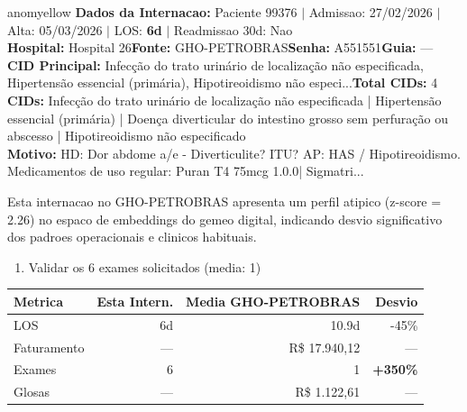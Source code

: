 \documentclass[a4paper,10pt]{article}
\begin{document}
\begin{anomalycard}[Internacao 167043 | GHO-PETROBRAS | MODERADO (z=2.26)]{anomyellow}
\textbf{Dados da Internacao:} Paciente 99376 $\mid$ Admissao: 27/02/2026 $\mid$ Alta: 05/03/2026 $\mid$ LOS: \textbf{6d} $\mid$ Readmissao 30d: Nao\\
\textbf{Hospital:} Hospital 26\quad\textbf{Fonte:} GHO-PETROBRAS\quad\textbf{Senha:} A551551\quad\textbf{Guia:} ---\\
\textbf{CID Principal:} {\small Infecção do trato urinário de localização não especificada, Hipertensão essencial (primária), Hipotireoidismo não especi...}\quad\textbf{Total CIDs:} 4\\

\textbf{CIDs:} {\scriptsize Infecção do trato urinário de localização não especificada | Hipertensão essencial (primária) | Doença diverticular do intestino grosso sem perfuração ou abscesso | Hipotireoidismo não especificado}\\

\textbf{Motivo:} {\scriptsize HD: Dor abdome a/e - Diverticulite? ITU?  AP: HAS / Hipotireoidismo. Medicamentos de uso regular: Puran T4 75mcg 1.0.0| Sigmatri...}\\

\vspace{2pt}\begin{tcolorbox}[colback=severityred!20,colframe=anomyellow,title={\textbf{Interpretacao de Negocio}},fonttitle=\bfseries\small,left=4pt,right=4pt,top=3pt,bottom=3pt]
{\small Esta internacao no GHO-PETROBRAS apresenta um perfil atipico (z-score = 2.26) no espaco de embeddings do gemeo digital, indicando desvio significativo dos padroes operacionais e clinicos habituais.}
\end{tcolorbox}
\begin{tcolorbox}[colback=severityyellow!30,colframe=anomorange,title={\textbf{Recomendacoes Especificas}},fonttitle=\bfseries\small,left=4pt,right=4pt,top=3pt,bottom=3pt]
\begin{enumerate}[nosep,leftmargin=16pt]
\item {\small Validar os 6 exames solicitados (media: 1)}
\end{enumerate}
\end{tcolorbox}
\begin{center}\begin{tabular}{l r r r}\toprule\textbf{Metrica} & \textbf{Esta Intern.} & \textbf{Media GHO-PETROBRAS} & \textbf{Desvio} \\\midrule
LOS & 6d & 10.9d & -45\% \\
Faturamento & --- & R\$ 17.940,12 & --- \\
Exames & 6 & 1 & \textcolor{anomred}{\textbf{+350\%}} \\
Glosas & --- & R\$ 1.122,61 & --- \\
\bottomrule\end{tabular}\end{center}


\end{anomalycard}
\end{document}
